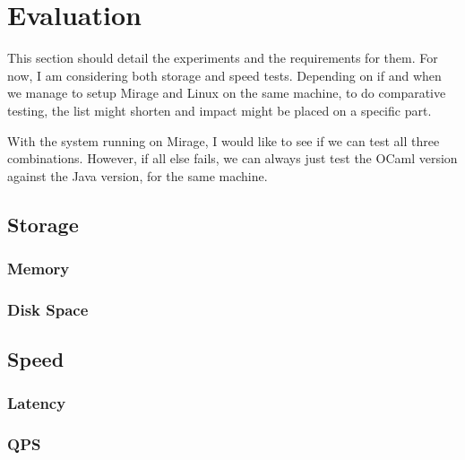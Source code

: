 \chapter{Evaluation} 
This section should detail the experiments and the requirements for them.
For now, I am considering both storage and speed tests.
Depending on if and when we manage to setup Mirage and Linux on the same machine, to do comparative testing, the list might shorten and impact might be placed on a specific part.

With the system running on Mirage, I would like to see if we can test all three combinations.
However, if all else fails, we can always just test the OCaml version against the Java version, for the same machine.

\section{Storage}
\subsection{Memory}
\subsection{Disk Space}

\section{Speed}
\subsection{Latency}
\subsection{QPS}

